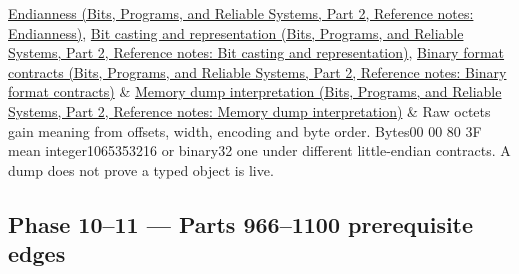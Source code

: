{\begin{longtable}[]
\href{../01-Bits-Programs-and-Reliable-Systems-P02/main.pdf\#nameddest=appendix-bc07c3d25b18}{Endianness (Bits, Programs, and Reliable Systems, Part 2, Reference notes: Endianness)}, \href{../01-Bits-Programs-and-Reliable-Systems-P02/main.pdf\#nameddest=appendix-34ee45f161c1}{Bit casting and representation (Bits, Programs, and Reliable Systems, Part 2, Reference notes: Bit casting and representation)}, \href{../01-Bits-Programs-and-Reliable-Systems-P02/main.pdf\#nameddest=appendix-590bbb2424c1}{Binary format contracts (Bits, Programs, and Reliable Systems, Part 2, Reference notes: Binary format contracts)} & \href{../01-Bits-Programs-and-Reliable-Systems-P02/main.pdf\#nameddest=appendix-230b59c0676b}{Memory dump interpretation (Bits, Programs, and Reliable Systems, Part 2, Reference notes: Memory dump interpretation)} & Raw octets gain meaning from offsets, width, encoding and byte order. Bytes00 00 80 3F mean integer1065353216 or binary32 one under different little-endian contracts. A dump does not prove a typed object is live. \\
\end{longtable}
}

\subsection{Phase 10--11 --- Parts 966--1100 prerequisite edges}\label{appendix-4ad47bdd269a-phase-1011-parts-9661100-prerequisite-edges}

\hypertarget{appendix-4ad47bdd269a-phase-1011-parts-9661100-prerequisite-edges}{}

